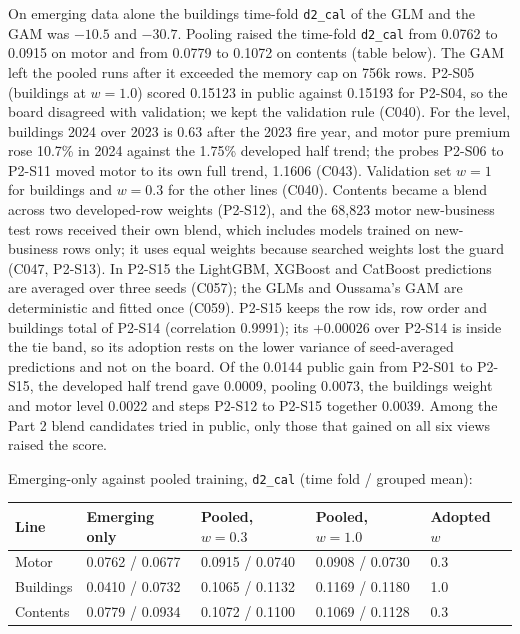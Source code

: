 On emerging data alone the buildings time-fold \texttt{d2\_cal} of the GLM and the GAM was $-10.5$ and $-30.7$. Pooling
raised the time-fold \texttt{d2\_cal} from 0.0762 to 0.0915 on motor and from 0.0779 to 0.1072 on contents (table
below). The GAM left the pooled runs after it exceeded the memory cap on 756k rows. P2-S05 (buildings at $w = 1.0$)
scored 0.15123 in public against 0.15193 for P2-S04, so the board disagreed with validation; we kept the validation
rule (C040). For the level, buildings 2024 over 2023 is 0.63 after the 2023 fire year, and motor pure premium rose
10.7\% in 2024 against the 1.75\% developed half trend; the probes P2-S06 to P2-S11 moved motor to its own full trend,
1.1606 (C043). Validation set $w = 1$ for buildings and $w = 0.3$ for the other lines (C040). Contents became a blend across
two developed-row weights (P2-S12), and the 68,823 motor new-business test rows received their own blend, which
includes models trained on new-business rows only; it uses equal weights because searched weights lost the guard
(C047, P2-S13). In P2-S15 the LightGBM, XGBoost and CatBoost predictions are averaged over three seeds
(C057); the GLMs and Oussama's GAM are deterministic and fitted once (C059). P2-S15
keeps the row ids, row order and buildings total of P2-S14 (correlation 0.9991); its +0.00026 over P2-S14 is inside
the tie band, so its adoption rests on the lower variance of seed-averaged predictions and not on the board. Of the
0.0144 public gain from P2-S01 to P2-S15, the developed half trend gave 0.0009, pooling 0.0073, the buildings weight
and motor level 0.0022 and steps P2-S12 to P2-S15 together 0.0039. Among the Part 2 blend candidates tried in public,
only those that gained on all six views raised the score.

Emerging-only against pooled training, \texttt{d2\_cal} (time fold / grouped mean):

\begin{center}
\small
\begin{tabular}{lllll}
\hline
Line & Emerging only & Pooled, $w = 0.3$ & Pooled, $w = 1.0$ & Adopted $w$\\
\hline
Motor & 0.0762 / 0.0677 & 0.0915 / 0.0740 & 0.0908 / 0.0730 & 0.3\\
Buildings & 0.0410 / 0.0732 & 0.1065 / 0.1132 & 0.1169 / 0.1180 & 1.0\\
Contents & 0.0779 / 0.0934 & 0.1072 / 0.1100 & 0.1069 / 0.1128 & 0.3\\
\hline
\end{tabular}
\end{center}

